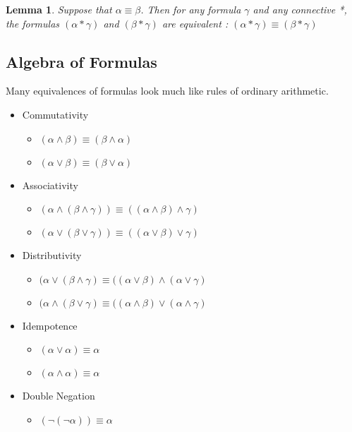 \documentclass{article}
\newtheorem{lemma}[theorem]{Lemma}
\begin{document}
\begin{lemma} Suppose that \( \alpha \equiv \beta\). Then for any formula \(\gamma\) and any connective *, the formulas \((\alpha * \gamma)\) and \((\beta * \gamma)\) are equivalent : \((\alpha * \gamma) \equiv (\beta * \gamma)\)
\end{lemma}

\subsection{Algebra of Formulas}
Many equivalences of formulas look much like rules of ordinary
arithmetic.
\begin{itemize}
\item Commutativity 
\begin{itemize}
\item \((\alpha \wedge \beta) \equiv (\beta \wedge \alpha)\)
\item \((\alpha \vee \beta) \equiv (\beta \vee \alpha)\)
\end{itemize}

\item Associativity
\begin{itemize}
\item \((\alpha \wedge (\beta \wedge \gamma)) \equiv ((\alpha \wedge \beta) \wedge \gamma)\)
\item \((\alpha \vee (\beta \vee \gamma)) \equiv ((\alpha \vee \beta) \vee \gamma)\)
\end{itemize}

\item Distributivity
\begin{itemize}
\item \((\alpha \vee (\beta \wedge \gamma) \equiv ((\alpha \vee \beta) \wedge (\alpha \vee \gamma)\) 
\item \((\alpha \wedge (\beta \vee \gamma) \equiv ((\alpha \wedge \beta) \vee (\alpha \wedge \gamma)\) 
\end{itemize}

\item Idempotence 
\begin{itemize}
\item \((\alpha \vee \alpha) \equiv \alpha\)
\item \((\alpha \wedge \alpha) \equiv \alpha\)
\end{itemize}

\item Double Negation 
\begin{itemize}
\item \((\neg (\neg \alpha)) \equiv \alpha\)
\end{itemize}


\end{itemize}
\end{document}
